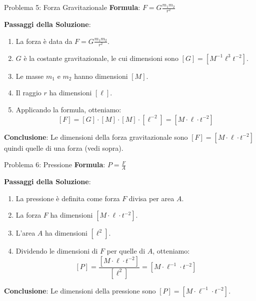 \documentclass{beamer}
\begin{document}
\begin{frame}{Problema 5: Forza Gravitazionale}
    \textbf{Formula}: \( F = G \frac{m_1 m_2}{r^2} \)
    
    \textbf{Passaggi della Soluzione}:
    \begin{enumerate}
        \item La forza è data da \( F = G \frac{m_1 m_2}{r^2} \).
        \item \(G\) è la costante gravitazionale, le cui dimensioni sono \([G] = [M^{-1} \ell^3 t^{-2}]\).
        \item Le masse \(m_1\) e \(m_2\) hanno dimensioni \([M]\).
        \item Il raggio \(r\) ha dimensioni \([\ell]\).
        \item Applicando la formula, otteniamo:
        \[
        [F] = [G] \cdot [M] \cdot [M] \cdot [\ell^{-2}] = [M \cdot \ell \cdot t^{-2}]
        \]
    \end{enumerate}
    \textbf{Conclusione}: Le dimensioni della forza gravitazionale sono \([F] = [M \cdot \ell \cdot t^{-2}]\) quindi quelle di una forza (vedi sopra).
\end{frame}

\begin{frame}{Problema 6: Pressione}
    \textbf{Formula}: \( P = \frac{F}{A} \)
    
    \textbf{Passaggi della Soluzione}:
    \begin{enumerate}
        \item La pressione è definita come forza \(F\) divisa per area \(A\).
        \item La forza \(F\) ha dimensioni \([M \cdot \ell \cdot t^{-2}]\).
        \item L'area \(A\) ha dimensioni \([\ell^2]\).
        \item Dividendo le dimensioni di \(F\) per quelle di \(A\), otteniamo:
        \[
        [P] = \frac{[M \cdot \ell \cdot t^{-2}]}{[\ell^2]} = [M \cdot \ell^{-1} \cdot t^{-2}]
        \]
    \end{enumerate}
    \textbf{Conclusione}: Le dimensioni della pressione sono \([P] = [M \cdot \ell^{-1} \cdot t^{-2}]\).
\end{frame}
\end{document}
